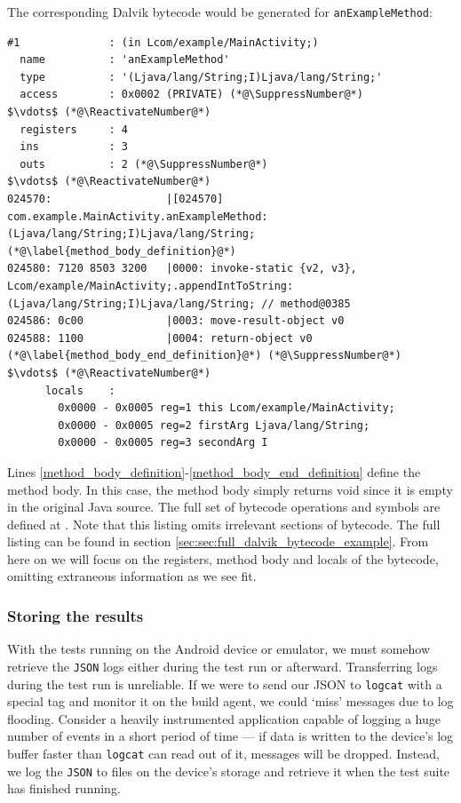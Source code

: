 The corresponding Dalvik bytecode would be generated for {\tt anExampleMethod}:

\begin{lstlisting}[mathescape,numberblanklines=false]
#1              : (in Lcom/example/MainActivity;)
  name          : 'anExampleMethod'
  type          : '(Ljava/lang/String;I)Ljava/lang/String;'
  access        : 0x0002 (PRIVATE) (*@\SuppressNumber@*)
$\vdots$ (*@\ReactivateNumber@*)
  registers     : 4
  ins           : 3
  outs          : 2 (*@\SuppressNumber@*)
$\vdots$ (*@\ReactivateNumber@*)
024570:                  |[024570] com.example.MainActivity.anExampleMethod:(Ljava/lang/String;I)Ljava/lang/String; (*@\label{method_body_definition}@*)
024580: 7120 8503 3200   |0000: invoke-static {v2, v3}, Lcom/example/MainActivity;.appendIntToString:(Ljava/lang/String;I)Ljava/lang/String; // method@0385
024586: 0c00             |0003: move-result-object v0
024588: 1100             |0004: return-object v0 (*@\label{method_body_end_definition}@*) (*@\SuppressNumber@*)
$\vdots$ (*@\ReactivateNumber@*)
      locals    :
        0x0000 - 0x0005 reg=1 this Lcom/example/MainActivity;
        0x0000 - 0x0005 reg=2 firstArg Ljava/lang/String;
        0x0000 - 0x0005 reg=3 secondArg I
\end{lstlisting}

Lines \ref{method_body_definition}-\ref{method_body_end_definition} define the method body. In this case, the method body simply returns void since it is empty in the original Java source. The full set of bytecode operations and symbols are defined at \cite{dalvikBytecode}. Note that this listing omits irrelevant sections of bytecode. The full listing can be found in section \ref{sec:sec:full_dalvik_bytecode_example}. From here on we will focus on the registers, method body and locals of the bytecode, omitting extraneous information as we see fit.



\subsubsection{Storing the results}

With the tests running on the Android device or emulator, we must somehow retrieve the {\tt JSON} logs either during the test run or afterward. Transferring logs during the test run is unreliable. If we were to send our JSON to {\tt logcat} with a special tag and monitor it on the build agent, we could {\lq}miss{\rq} messages due to log flooding. Consider a heavily instrumented application capable of logging a huge number of events in a short period of time --- if data is written to the device's log buffer faster than {\tt logcat} can read out of it, messages will be dropped. Instead, we log the {\tt JSON} to files on the device's storage and retrieve it when the test suite has finished running.

